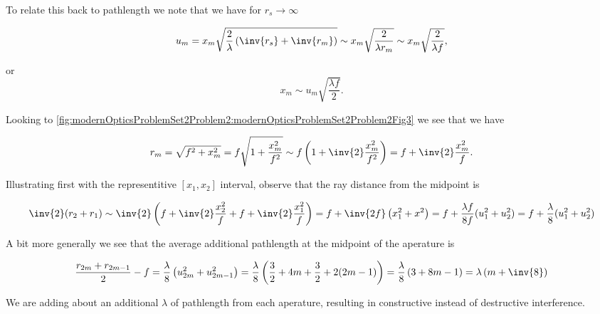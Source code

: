 {To relate this back to pathlength we note that we have for $r_s \rightarrow \infty$

\begin{dmath}\label{eqn:modernOptics:ProblemSet2:P2:240}
u_m 
= x_m \sqrt{ \frac{2}{\lambda} \left( \inv{r_s} + \inv{r_m} \right) }
\sim 
x_m \sqrt{ \frac{2}{\lambda r_m} }
\sim 
x_m \sqrt{ \frac{2}{\lambda f} },
\end{dmath}

or
\begin{equation}\label{eqn:modernOptics:ProblemSet2:P2:260}
x_m \sim u_m \sqrt{ \frac{\lambda f}{2} }.
\end{equation}

Looking to \cref{fig:modernOpticsProblemSet2Problem2:modernOpticsProblemSet2Problem2Fig3} we see that we have


\begin{dmath}\label{eqn:modernOptics:ProblemSet2:P2:280}
r_m 
= \sqrt{f^2 + x_m^2} 
= f \sqrt{ 1 + \frac{x_m^2}{f^2} }
\sim f \left( 1 + \inv{2} \frac{x_m^2}{f^2} \right)
= f + \inv{2} \frac{x_m^2}{f}.
\end{dmath}

Illustrating first with the representitive $[x_1, x_2]$ interval, observe that the ray distance from the midpoint is

\begin{dmath}\label{eqn:modernOptics:ProblemSet2:P2:300}
\inv{2} (r_2 + r_1) \sim 
\inv{2} \left( 
f + \inv{2} \frac{x_2^2}{f} 
+f + \inv{2} \frac{x_1^2}{f} 
\right)
=
f + \inv{2 f} \left( x_1^2 + x^2 \right)
=
f + \frac{\lambda f}{8 f} ( u_1^2 + u_2^2 )
=
f + \frac{\lambda}{8} ( u_1^2 + u_2^2 )
\end{dmath}

A bit more generally we see that the average additional pathlength at the midpoint of the aperature is 

\begin{dmath}\label{eqn:modernOptics:ProblemSet2:P2:320}
\frac{r_{2m} + r_{2m-1}}{2} - f 
= \frac{\lambda}{8} \left( u_{2m}^2 + u_{2m-1}^2 \right)
= \frac{\lambda}{8} \left( \frac{3}{2} + 4 m + \frac{3}{2} + 2 (2m -1) \right)
= \frac{\lambda}{8} \left( 3 + 8 m - 1 \right)
= \lambda \left( m + \inv{8} \right)
\end{dmath}

We are adding about an additional $\lambda$ of pathlength from each aperature, resulting in constructive instead of destructive interference.

}
